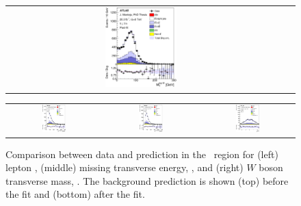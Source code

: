 \begin{figure}[tp]
\begin{tabular}{ccc}
  \includegraphics[width=0.27\textwidth]{Analysis/Figures_ttH/tesis_vars/postfit/WlepMT_5jetex3btagex.eps} \\
\end{tabular}
\caption{Comparison between data and prediction in the \fivethree\ region for (left) lepton \pt,  (middle) missing transverse energy, \met, and (right)  $W$ boson transverse mass, \mtw. The background prediction is shown (top) before the fit and (bottom) after the fit.}
  \label{fig:vars1_fivethree}
\vspace{0.5cm}
  \centering
  \begin{tabular}{ccc}
  \includegraphics[width=0.27\textwidth]{Analysis/Figures_ttH/tesis_vars/prefit/jet1_pt_5jetex3btagex.eps} &
  \includegraphics[width=0.27\textwidth]{Analysis/Figures_ttH/tesis_vars/prefit/bjet1_pt_5jetex3btagex.eps} &
  \includegraphics[width=0.27\textwidth]{Analysis/Figures_ttH/tesis_vars/prefit/lep_eta_5jetex3btagex.eps} \\

\end{tabular}
\end{figure}
